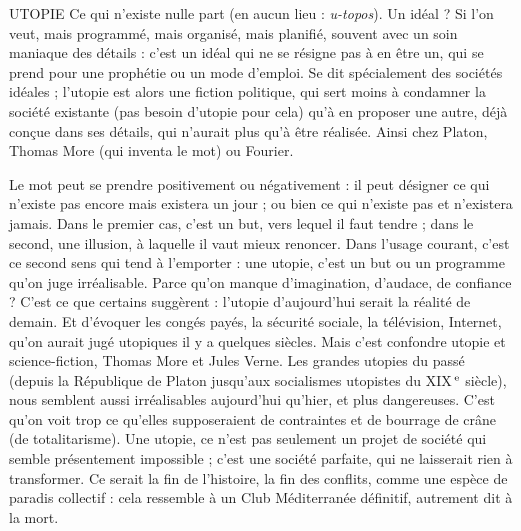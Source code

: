UTOPIE Ce qui n’existe nulle part (en aucun lieu : {\it u-topos}). Un idéal ? Si
l’on veut, mais programmé, mais organisé, mais planifié, souvent
avec un soin maniaque des détails : c’est un idéal qui ne se résigne pas à en être
un, qui se prend pour une prophétie ou un mode d’emploi. Se dit spécialement
des sociétés idéales ; l’utopie est alors une fiction politique, qui sert moins à
condamner la société existante (pas besoin d’utopie pour cela) qu’à en proposer
une autre, déjà conçue dans ses détails, qui n’aurait plus qu’à être réalisée. Ainsi
chez Platon, Thomas More (qui inventa le mot) ou Fourier.

Le mot peut se prendre positivement ou négativement : il peut désigner ce
qui n’existe pas encore mais existera un jour ; ou bien ce qui n’existe pas et
n’existera jamais. Dans le premier cas, c’est un but, vers lequel il faut tendre ;
dans le second, une illusion, à laquelle il vaut mieux renoncer. Dans l’usage
courant, c’est ce second sens qui tend à l'emporter : une utopie, c’est un but ou
un programme qu'on juge irréalisable. Parce qu’on manque d’imagination,
d’audace, de confiance ? C’est ce que certains suggèrent : l'utopie d’aujourd’hui
serait la réalité de demain. Et d’évoquer les congés payés, la sécurité sociale, la
télévision, Internet, qu’on aurait jugé utopiques il y a quelques siècles. Mais
c’est confondre utopie et science-fiction, Thomas More et Jules Verne. Les
grandes utopies du passé (depuis la République de Platon jusqu’aux socialismes
utopistes du {\footnotesize XIX}$^\text{\,e}$ siècle), nous semblent aussi irréalisables aujourd’hui qu’hier,
et plus dangereuses. C’est qu’on voit trop ce qu’elles supposeraient de
contraintes et de bourrage de crâne (de totalitarisme). Une utopie, ce n’est pas
seulement un projet de société qui semble présentement impossible ; c’est une
société parfaite, qui ne laisserait rien à transformer. Ce serait la fin de l’histoire,
la fin des conflits, comme une espèce de paradis collectif : cela ressemble à un
Club Méditerranée définitif, autrement dit à la mort.

